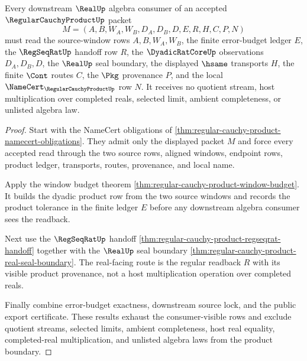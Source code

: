 \begin{theorem}
\label{thm:regular-cauchy-product-real-algebra-boundary}
Every downstream $\RealUp$ algebra consumer of an accepted $\RegularCauchyProductUp$ packet
$$
M=(A,B,W_A,W_B,D_A,D_B,D,E,R,H,C,P,N)
$$
must read the source-window rows $A,B,W_A,W_B$, the finite error-budget ledger $E$, the $\RegSeqRatUp$ handoff row $R$, the $\DyadicRatCoreUp$ observations $D_A,D_B,D$, the $\RealUp$ seal boundary, the displayed $\hsame$ transports $H$, the finite $\Cont$ routes $C$, the $\Pkg$ provenance $P$, and the local $\NameCert_{\RegularCauchyProductUp}$ row $N$. It receives no quotient stream, host multiplication over completed reals, selected limit, ambient completeness, or unlisted algebra law.
\end{theorem}
\begin{proof}
Start with the NameCert obligations of \autoref{thm:regular-cauchy-product-namecert-obligations}. They admit only the displayed packet $M$ and force every accepted read through the two source rows, aligned windows, endpoint rows, product ledger, transports, routes, provenance, and local name.

Apply the window budget theorem \autoref{thm:regular-cauchy-product-window-budget}. It builds the dyadic product row from the two source windows and records the product tolerance in the finite ledger $E$ before any downstream algebra consumer sees the readback.

Next use the $\RegSeqRatUp$ handoff \autoref{thm:regular-cauchy-product-regseqrat-handoff} together with the $\RealUp$ seal boundary \autoref{thm:regular-cauchy-product-real-seal-boundary}. The real-facing route is the regular readback $R$ with its visible product provenance, not a host multiplication operation over completed reals.

Finally combine error-budget exactness, downstream source lock, and the public export certificate. These results exhaust the consumer-visible rows and exclude quotient streams, selected limits, ambient completeness, host real equality, completed-real multiplication, and unlisted algebra laws from the product boundary.
\end{proof}

